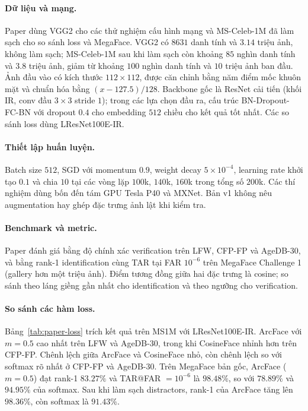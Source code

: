 \documentclass[a4paper,12pt]{article}
\begin{document}
\paragraph{Dữ liệu và mạng.} Paper dùng VGG2 cho các thử nghiệm cấu hình mạng và MS-Celeb-1M đã làm sạch cho so sánh loss và MegaFace. VGG2 có $8631$ danh tính và $3.14$ triệu ảnh, không làm sạch; MS-Celeb-1M sau khi làm sạch còn khoảng $85$ nghìn danh tính và $3.8$ triệu ảnh, giảm từ khoảng $100$ nghìn danh tính và $10$ triệu ảnh ban đầu. Ảnh đầu vào có kích thước $112 \times 112$, được căn chỉnh bằng năm điểm mốc khuôn mặt và chuẩn hóa bằng $(x - 127.5)/128$. Backbone gốc là ResNet cải tiến (khối IR, conv đầu $3\times3$ stride $1$); trong các lựa chọn đầu ra, cấu trúc BN-Dropout-FC-BN với dropout $0.4$ cho embedding $512$ chiều cho kết quả tốt nhất. Các so sánh loss dùng LResNet100E-IR.

\paragraph{Thiết lập huấn luyện.} Batch size $512$, SGD với momentum $0.9$, weight decay $5\times10^{-4}$, learning rate khởi tạo $0.1$ và chia $10$ tại các vòng lặp $100$k, $140$k, $160$k trong tổng số $200$k. Các thí nghiệm dùng bốn đến tám GPU Tesla P40 và MXNet. Bản v1 không nêu augmentation hay ghép đặc trưng ảnh lật khi kiểm tra.

\paragraph{Benchmark và metric.} Paper đánh giá bằng độ chính xác verification trên LFW, CFP-FP và AgeDB-30, và bằng rank-1 identification cùng TAR tại FAR $10^{-6}$ trên MegaFace Challenge 1 (gallery hơn một triệu ảnh). Điểm tương đồng giữa hai đặc trưng là cosine; so sánh theo láng giềng gần nhất cho identification và theo ngưỡng cho verification.

\paragraph{So sánh các hàm loss.} Bảng~\ref{tab:paper-loss} trích kết quả trên MS1M với LResNet100E-IR. ArcFace với $m = 0.5$ cao nhất trên LFW và AgeDB-30, trong khi CosineFace nhỉnh hơn trên CFP-FP. Chênh lệch giữa ArcFace và CosineFace nhỏ, còn chênh lệch so với softmax rõ nhất ở CFP-FP và AgeDB-30. Trên MegaFace bản gốc, ArcFace ($m = 0.5$) đạt rank-1 $83.27\%$ và TAR@FAR $=10^{-6}$ là $98.48\%$, so với $78.89\%$ và $94.95\%$ của softmax. Sau khi làm sạch distractors, rank-1 của ArcFace tăng lên $98.36\%$, còn softmax là $91.43\%$.
\end{document}
